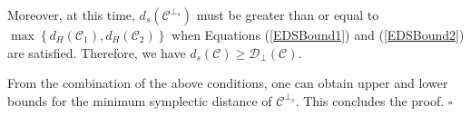 \documentclass[journal]{IEEEtran}
\newenvironment{proof}{{\noindent\it Proof:} }{\hfill $\square$\par}
\newtheorem{remark}{Remark}
\begin{document}
\begin{proof}
	Moreover, at this time, $d_s(\mathscr{C}^{\perp_s})$ must be greater than or equal to $\max\left\{ d_H(\mathscr{C}_1),d_H(\mathscr{C}_2) \right\}$ when Equations (\ref{EDSBound1}) and (\ref{EDSBound2}) are satisfied.
 Therefore, we have $d_s(\mathscr{C})\ge\mathcal{D}_{\perp}(\mathscr{C})$.
 
	From the combination of the above conditions, one can obtain upper and lower bounds for the minimum symplectic distance of $\mathscr{C}^{\perp_s}$. This concludes the proof.
\end{proof}
%


\end{document}
